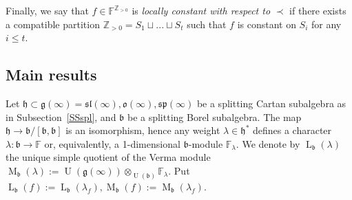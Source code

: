 \documentclass{emsprocart}
\begin{document}
Finally, we say that $f\in \mathbb F^{\mathbb Z_{>0}}$ is {\it locally constant with respect to} $\prec$ if there exists
a compatible partition $\mathbb Z_{>0}=S_1\sqcup...\sqcup S_t$ such
that $f$ is constant on $S_i$ for any $i\le t$.

\subsection{Main results}\label{SStmr} Let $\mathfrak h\subset\mathfrak g(\infty)=\mathfrak{sl}(\infty), \mathfrak o(\infty), \mathfrak{sp}(\infty)$ be a splitting Cartan subalgebra as in Subsection~\ref{SSspl}, and $\mathfrak b$ be a splitting Borel subalgebra. The map $\mathfrak h\to \mathfrak b/[\mathfrak b, \mathfrak b]$ is an isomorphism, hence any weight $\lambda\in\mathfrak h^*$ defines a character $\lambda:\mathfrak b\to\mathbb F$ or, equivalently, a 1-dimensional $\mathfrak b$-module $\mathbb F_\lambda$. We denote by $\operatorname{L}_\mathfrak b(\lambda)$ the unique simple quotient of the Verma module $\operatorname{M}_\mathfrak b(\lambda):=\operatorname{U}(\mathfrak g(\infty))\otimes_{\operatorname{U}(\mathfrak b)}\mathbb F_\lambda$. Put $\operatorname{L}_\mathfrak b(f):=\operatorname{L}_\mathfrak b(\lambda_f), \operatorname{M}_\mathfrak b(f):=\operatorname{M}_\mathfrak b(\lambda_f)$.
\end{document}
